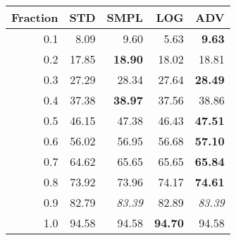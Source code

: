 \documentclass{standalone}
\begin{document}
\begin{tabular}{r|rrrr}
      \toprule
      Fraction & STD & SMPL & LOG & ADV\\
      \midrule
      0.1 & 8.09 & 9.60 & 5.63 & \textbf{9.63}\\
  0.2 & 17.85 & \textbf{18.90} & 18.02 & 18.81\\
  0.3 & 27.29 & 28.34 & 27.64 & \textbf{28.49}\\
  0.4 & 37.38 & \textbf{38.97} & 37.56 & 38.86\\
  0.5 & 46.15 & 47.38 & 46.43 & \textbf{47.51}\\
  0.6 & 56.02 & 56.95 & 56.68 & \textbf{57.10}\\
  0.7 & 64.62 & 65.65 & 65.65 & \textbf{65.84}\\
  0.8 & 73.92 & 73.96 & 74.17 & \textbf{74.61}\\
  0.9 & 82.79 & \emph{83.39} & 82.89 & \emph{83.39}\\
  1.0 & 94.58 & 94.58 & \textbf{94.70} & 94.58\\
  \bottomrule
\end{tabular}
\end{document}
